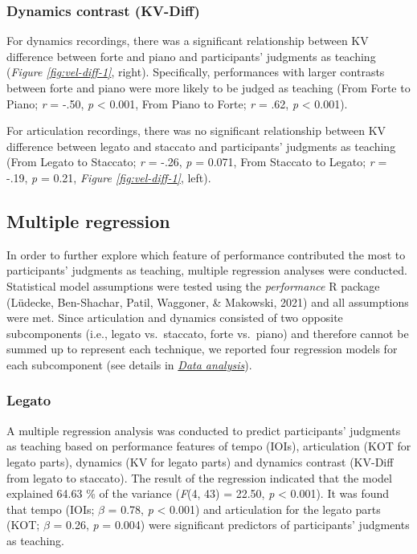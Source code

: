 \documentclass[
  man,floatsintext]{apa6}
\begin{document}
\hypertarget{dynamics-contrast-kv-diff}{%
\subsubsection{Dynamics contrast (KV-Diff)}\label{dynamics-contrast-kv-diff}}

For dynamics recordings, there was a significant relationship between KV difference between forte and piano and participants' judgments as teaching (\emph{Figure \ref{fig:vel-diff-1}}, right). Specifically, performances with larger contrasts between forte and piano were more likely to be judged as teaching (From Forte to Piano; \emph{r} = -.50, \emph{p} \textless{} 0.001, From Piano to Forte; \emph{r} = .62, \emph{p} \textless{} 0.001).

For articulation recordings, there was no significant relationship between KV difference between legato and staccato and participants' judgments as teaching (From Legato to Staccato; \emph{r} = -.26, \emph{p} = 0.071, From Staccato to Legato; \emph{r} = -.19, \emph{p} = 0.21, \emph{Figure \ref{fig:vel-diff-1}}, left).

\hypertarget{multiple-regression}{%
\subsection{Multiple regression}\label{multiple-regression}}

In order to further explore which feature of performance contributed the most to participants' judgments as teaching, multiple regression analyses were conducted. Statistical model assumptions were tested using the \emph{performance} R package (Lüdecke, Ben-Shachar, Patil, Waggoner, \& Makowski, 2021) and all assumptions were met. Since articulation and dynamics consisted of two opposite subcomponents (i.e., legato vs.~staccato, forte vs.~piano) and therefore cannot be summed up to represent each technique, we reported four regression models for each subcomponent (see details in \emph{\protect\hyperlink{dataanalysis}{Data analysis}}).

\hypertarget{legato}{%
\subsubsection{Legato}\label{legato}}

A multiple regression analysis was conducted to predict participants' judgments as teaching based on performance features of tempo (IOIs), articulation (KOT for legato parts), dynamics (KV for legato parts) and dynamics contrast (KV-Diff from legato to staccato). The result of the regression indicated that the model explained 64.63 \% of the variance (\emph{F}(4, 43) = 22.50, \emph{p} \textless{} 0.001). It was found that tempo (IOIs; \emph{\(\beta\)} = 0.78, \emph{p} \textless{} 0.001) and articulation for the legato parts (KOT; \emph{\(\beta\)} = 0.26, \emph{p} = 0.004) were significant predictors of participants' judgments as teaching.
\end{document}

